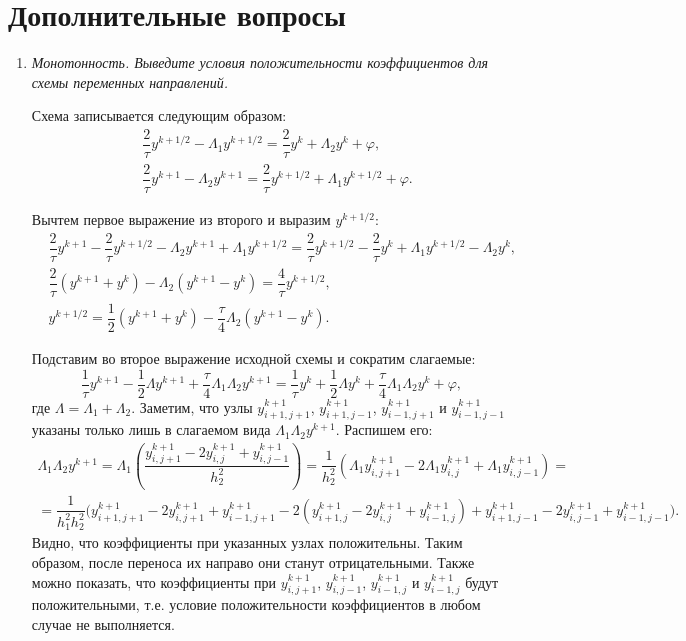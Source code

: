\documentclass[12pt, a4paper]{article}
\begin{document}
	\section{Дополнительные вопросы}
	\begin{enumerate}
		\item \textit{Монотонность. Выведите условия положительности коэффициентов для схемы переменных направлений.}
		\smallskip
		
		Схема записывается следующим образом:
		\begin{eqnarray*}
			& \dfrac2\tau y^{k+1/2} - \Lambda_1 y^{k+1/2} = \dfrac2\tau y^k + \Lambda_2 y^k + \varphi, \\
			& \dfrac2\tau y^{k+1} - \Lambda_2 y^{k+1} = \dfrac2\tau y^{k+1/2} + \Lambda_1 y^{k+1/2} + \varphi.
		\end{eqnarray*}
		
		Вычтем первое выражение из второго и выразим $y^{k+1/2}$:
		\begin{eqnarray*}
			& \dfrac2\tau y^{k+1} - \dfrac2\tau y^{k+1/2} - \Lambda_2 y^{k+1} + \Lambda_1 y^{k+1/2} = \dfrac2\tau y^{k+1/2} - \dfrac2\tau y^k + \Lambda_1 y^{k+1/2} - \Lambda_2 y^k, \\
			& \dfrac2\tau (y^{k+1}+y^k) - \Lambda_2 (y^{k+1}-y^k) = \dfrac4\tau y^{k+1/2},\\
			& y^{k+1/2} = \dfrac12 (y^{k+1}+y^k) - \dfrac\tau4 \Lambda_2 (y^{k+1}-y^k).
		\end{eqnarray*}
		
		Подставим во второе выражение исходной схемы и сократим слагаемые:
		\begin{equation*}
			\dfrac1\tau y^{k+1} - \dfrac12 \Lambda y^{k+1} + \dfrac\tau4 \Lambda_1 \Lambda_2 y^{k+1} = \dfrac1\tau y^k + \dfrac12 \Lambda y^k + \dfrac\tau4 \Lambda_1 \Lambda_2 y^k + \varphi,
		\end{equation*}
		где $\Lambda = \Lambda_1 + \Lambda_2$. Заметим, что узлы $y^{k+1}_{i+1, j+1}$, $y^{k+1}_{i+1, j-1}$, $y^{k+1}_{i-1, j+1}$ и $y^{k+1}_{i-1, j-1}$ указаны только лишь в слагаемом вида $\Lambda_1 \Lambda_2 y^{k+1}$. Распишем его:
		\begin{multline*}
			\Lambda_1 \Lambda_2 y^{k+1} = \Lambda_1 \left(\dfrac{y^{k+1}_{i,j+1} - 2 y^{k+1}_{i,j} + y^{k+1}_{i,j-1}}{h_2^2}\right) = \dfrac1{h_2^2}\left( \Lambda_1 y^{k+1}_{i,j+1} - 2 \Lambda_1 y^{k+1}_{i,j} + \Lambda_1 y^{k+1}_{i,j-1}\right) = \\
			= \dfrac1{h_1^2 h_2^2} \Big(y^{k+1}_{i+1,j+1} -2 y^{k+1}_{i,j+1}+y^{k+1}_{i-1,j+1} - 2 (y^{k+1}_{i+1,j} - 2 y^{k+1}_{i,j} + y^{k+1}_{i-1,j}) + y^{k+1}_{i+1,j-1} - 2 y^{k+1}_{i,j-1} + y^{k+1}_{i-1,j-1}\Big).
		\end{multline*}
		Видно, что коэффициенты при указанных узлах положительны. Таким образом, после переноса их направо они станут отрицательными. Также можно показать, что коэффициенты при $y^{k+1}_{i, j+1}$, $y^{k+1}_{i, j-1}$, $y^{k+1}_{i-1, j}$ и $y^{k+1}_{i-1, j}$ будут положительными, т.е. условие положительности коэффициентов в любом случае не выполняется.
		

\end{enumerate}
\end{document}

